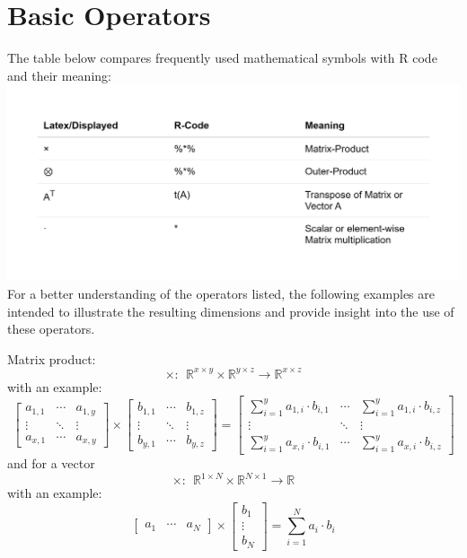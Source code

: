 \documentclass[
  oneside]{book}
\begin{document}
\hypertarget{basic-operators}{%
\section{Basic Operators}\label{basic-operators}}

The table below compares frequently used mathematical symbols with R code and their meaning:\\
\includegraphics{Master_Thesis_files/figure-latex/operators-1.png}
For a better understanding of the operators listed, the following examples are intended to illustrate the resulting dimensions and provide insight into the use of these operators.

Matrix product:
\[\times: \ \ \mathbb{R}^{x \times y} \times \mathbb{R}^{y \times z} \rightarrow \mathbb{R}^{x \times z} \]
with an example:
\[ 
\begin{bmatrix}a_{1,1} &\cdots  & a_{1,y} \\ \vdots & \ddots & \vdots  \\ a_{x,1} & \cdots & a_{x,y} \end{bmatrix}
\times
\begin{bmatrix}b_{1,1} &\cdots  & b_{1,z} \\ \vdots & \ddots & \vdots  \\ b_{y,1} & \cdots & b_{y,z} \end{bmatrix}
=
\begin{bmatrix} \sum_{i=1}^y a_{1, i} \cdot  b_{i,1} &\cdots  & \sum_{i=1}^y a_{1, i} \cdot  b_{i,z} \\ \vdots & \ddots & \vdots  \\ \sum_{i=1}^y a_{x, i} \cdot  b_{i,1}  & \cdots & \sum_{i=1}^y a_{x, i} \cdot  b_{i,z} \end{bmatrix}
\]
and for a vector
\[\times: \ \ \mathbb{R}^{1 \times N} \times \mathbb{R}^{N \times 1} \rightarrow \mathbb{R}\]
with an example:
\[
\begin{bmatrix}a_{1} &\cdots  &  a_{N}\end{bmatrix}
\times
\begin{bmatrix}b_{1}\\ \vdots \\  b_{N}\end{bmatrix}
=
\sum_{i=1}^N a_i \cdot  b_i
\]
\end{document}
